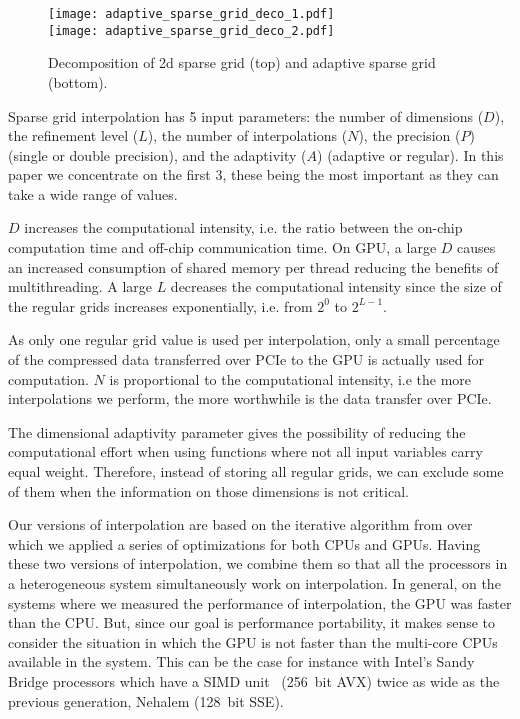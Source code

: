 \begin{figure}[h]
  \centering
  \texttt{[image: adaptive\_sparse\_grid\_deco\_1.pdf]} \\
  \vspace{5pt}
  \texttt{[image: adaptive\_sparse\_grid\_deco\_2.pdf]}
  \caption{Decomposition of 2d sparse grid (top) and adaptive sparse grid
  (bottom).}
  \label{fig:adaptive_sparse_grid_deco}
\end{figure}

Sparse grid interpolation has 5 input parameters: the number of dimensions
($D$), the refinement level ($L$), the number of interpolations ($N$), the
precision ($P$) (single or double precision), and the adaptivity ($A$) (adaptive
or regular). In this paper we concentrate on the first 3, these being the most
important as they can take a wide range of values.

$D$ increases the computational intensity, i.e. the ratio between the on-chip
computation time and off-chip communication time. On GPU, a large $D$ causes an
increased consumption of shared memory per thread reducing the benefits of
multithreading. A large $L$ decreases the computational intensity since the size
of the regular grids increases exponentially, i.e. from $2^0$ to $2^{L-1}$. 

As only one regular grid value is used per interpolation, only a small
percentage of the compressed data transferred over PCIe to the GPU is actually
used for computation. $N$ is proportional to the computational intensity, i.e
the more interpolations we perform, the more worthwhile is the data transfer over
PCIe.

The dimensional adaptivity parameter gives the possibility of reducing the
computational effort when using functions where not all input variables carry
equal weight. Therefore, instead of storing all regular grids, we can exclude
some of them when the information on those dimensions is not critical.

Our versions of interpolation are based on the iterative algorithm from
\cite{Murarasu:2011:CDS:1941553.1941559} over which we applied a series of
optimizations for both CPUs and GPUs. Having these two versions of
interpolation, we combine them so that all the processors in a heterogeneous
system simultaneously work on interpolation. In general, on the systems where we
measured the performance of interpolation, the GPU was faster than the CPU. But,
since our goal is performance portability, it makes sense to consider the
situation in which the GPU is not faster than the multi-core CPUs available in
the system. This can be the case for instance with Intel's Sandy Bridge
processors which have a SIMD unit~\cite{avx} (256~bit AVX) twice as wide as the
previous generation, Nehalem (128~bit SSE).

